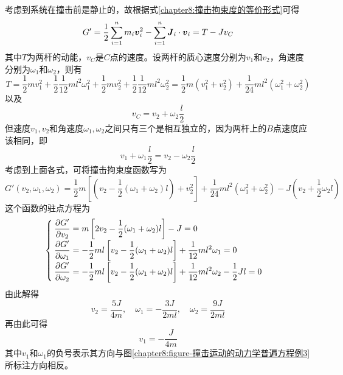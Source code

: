 \begin{solution}
考虑到系统在撞击前是静止的，故根据式\eqref{chapter8:撞击拘束度的等价形式}可得
\begin{align*}
	G' = \frac12 \sum_{i=1}^n m_i\boldsymbol{v}_i^2 - \sum_{i=1}^n \boldsymbol{J}_i \cdot \boldsymbol{v}_i = T - Jv_C
\end{align*}
其中$T$为两杆的动能，$v_C$是$C$点的速度。设两杆的质心速度分别为$v_1$和$v_2$，角速度分别为$\omega_1$和$\omega_2$，则有
\begin{equation*}
	T = \frac12 mv_1^2 + \frac12 \frac{1}{12}ml^2 \omega_1^2 + \frac12 mv_2^2 + \frac12 \frac{1}{12} ml^2 \omega_2^2 = \frac12 m(v_1^2+v_2^2) + \frac{1}{24} ml^2 (\omega_1^2 + \omega_2^2)
\end{equation*}
以及
\begin{equation*}
	v_C = v_2 + \omega_2\frac{l}{2}
\end{equation*}
但速度$v_1,v_2$和角速度$\omega_1,\omega_2$之间只有三个是相互独立的，因为两杆上的$B$点速度应该相同，即
\begin{equation*}
	v_1+\omega_1\frac{l}{2} = v_2-\omega_2\frac{l}{2}
\end{equation*}
考虑到上面各式，可将撞击拘束度函数写为
\begin{equation*}
	G'(v_2,\omega_1,\omega_2) = \frac12 m\left[\left(v_2-\frac12(\omega_1+\omega_2)l\right) + v_2^2\right] + \frac{1}{24}ml^2(\omega_1^2+\omega_2^2) - J\left(v_2+\frac12\omega_2l\right)
\end{equation*}
这个函数的驻点方程为
\begin{equation*}
\begin{cases}
	\displaystyle \dfrac{\partial G'}{\partial v_2} = m\left[2v_2 - \frac12(\omega_1+\omega_2)l\right] - J = 0 \\[1.5ex]
	\displaystyle \dfrac{\partial G'}{\partial \omega_1} = -\frac12 ml\left[v_2-\frac12(\omega_1+\omega_2)l\right] + \frac{1}{12}ml^2 \omega_1 = 0 \\[1.5ex]
	\displaystyle \dfrac{\partial G'}{\partial \omega_2} = -\frac12 ml\left[v_2-\frac12(\omega_1+\omega_2)l\right] + \frac{1}{12}ml^2 \omega_2 - \frac12 Jl = 0
\end{cases}
\end{equation*}
由此解得
\begin{equation*}
	v_2 = \frac{5J}{4m},\quad \omega_1 = -\frac{3J}{2ml},\quad \omega_2 = \frac{9J}{2ml}
\end{equation*}
再由此可得
\begin{equation*}
	v_1 = -\frac{J}{4m}
\end{equation*}
其中$v_1$和$\omega_1$的负号表示其方向与图\ref{chapter8:figure-撞击运动的动力学普遍方程例3}所标注方向相反。
\end{solution}


